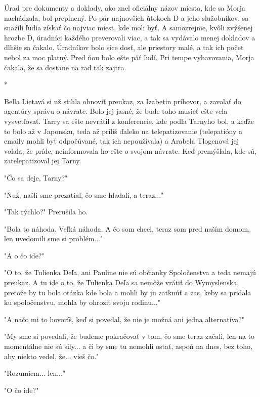 \documentclass{book}
\begin{document}
Úrad pre dokumenty a doklady, ako znel oficiálny názov miesta, kde sa Morja nachádzala, bol preplnený. Po pár najnovších útokoch D a jeho služobníkov, sa snažili ľudia získať čo najviac miest, kde moli byť. A samozrejme, kvôli zvýšenej hrozbe D, úradníci každého preverovali viac, a tak sa vydávalo menej dokladov a dlhšie sa čakalo. Úradníkov bolo síce dosť, ale priestory malé, a tak ich počet nebol za moc platný. Pred ňou bolo ešte päť ľudí. Pri tempe vybavovania, Morja čakala, že sa dostane na rad tak zajtra.

\begin{center}

*

\end{center}

Bella Lietavá si už stihla obnoviť preukaz, za Izabetin príhovor, a zavolať do agentúry správu o návrate. Bolo jej jasné, že bude toho musieť ešte veľa vysvetľovať. Tarry sa ešte nevrátil z konferencie, kde podľa Tarnyho bol, a keďže to bolo až v Japonsku, teda až príliš ďaleko na telepatizovanie (telepatióny a emaily mohli byť odpočúvané, tak ich nepoužívala) a Arabela Tlogenová jej volala, že príde, neinformovala ho ešte o svojom návrate. Keď premýšľala, kde sú, zatelepatizoval jej Tarny.

"$ $Čo sa deje, Tarny?"$ $ 

"$ $Nuž, našli sme prezatiaľ, čo sme hľadali, a teraz..."$ $ 

"$ $Tak rýchlo?"$ $  Prerušila ho.

"$ $Bola to náhoda. Veľká náhoda. A čo som chcel, teraz som pred naším domom, len uvedomili sme si problém..."$ $ 

"$ $A o čo ide?"$ $ 

"$ $O to, že Tulienka Deľa, ani Pauline nie sú občianky Spoločenstva a teda nemajú preukaz. A tu ide o to, že Tulienka Deľa sa nemôže vrátiť do Wymyslenska, pretože by tu bola otázka kde bola a mohli by ju zatknúť a zas, keby sa pridala ku spoločenstvu, mohla by ohroziť svoju rodinu..."$ $ 

"$ $A načo mi to hovoríš, keď si povedal, že nie je možná ani jedna alternatíva?"$ $ 

"$ $My sme si povedali, že budeme pokračovať v tom, čo sme teraz začali, len na to momentálne nie sú sily... a či by sme tu nemohli ostať, aspoň na dnes, bez toho, aby niekto vedel, že... vieš čo."$ $ 

"$ $Rozumiem... len..."$ $ 

"$ $O čo ide?"$ $ 
\end{document}
